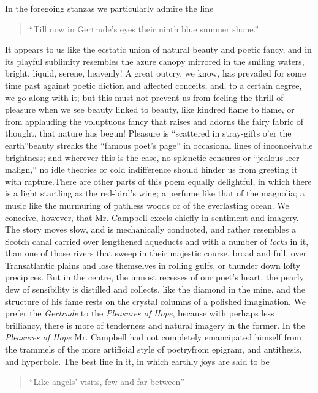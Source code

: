 In the foregoing stanzas we particularly admire the line\textemdash 
\begin{verse}
  ``Till now in Gertrude's eyes their ninth blue summer shone.''
\end{verse}
It appears to us like the ecstatic union of natural beauty and poetic
fancy, and in its playful sublimity resembles the azure canopy mirrored
in the smiling waters, bright, liquid, serene, heavenly! A great outcry,
we know, has prevailed for some time past against poetic diction and
affected conceits, and, to a certain degree, we go along with it; but
this must not prevent us from feeling the thrill of pleasure when we see
beauty linked to beauty, like kindred flame to flame, or from applauding
the voluptuous fancy that raises and adorns the fairy fabric of thought,
that nature has begun! Pleasure is ``scattered in stray-gifts o'er the
earth''\textemdash beauty streaks the ``famous poet's page'' in occasional lines of
inconceivable brightness; and wherever this is the case, no splenetic
censures or ``jealous leer malign,'' no idle theories or cold indifference
should hinder us from greeting it with rapture.\textemdash There are other parts
of this poem equally delightful, in which there is a light startling as
the red-bird's wing; a perfume like that of the magnolia; a music
like the murmuring of pathless woods or of the everlasting ocean. We
conceive, however, that Mr. Campbell excels chiefly in sentiment and
imagery. The story moves slow, and is mechanically conducted, and rather
resembles a Scotch canal carried over lengthened aqueducts and with a
number of \emph{locks} in it, than one of those rivers that sweep in their
majestic course, broad and full, over Transatlantic plains and lose
themselves in rolling gulfs, or thunder down lofty precipices. But in
the centre, the inmost recesses of our poet's heart, the pearly dew of
sensibility is distilled and collects, like the diamond in the mine, and
the structure of his fame rests on the crystal columns of a polished
imagination. We prefer the \emph{Gertrude} to the \emph{Pleasures of Hope},
because with perhaps less brilliancy, there is more of tenderness and
natural imagery in the former. In the \emph{Pleasures of Hope} Mr. Campbell
had not completely emancipated himself from the trammels of the more
artificial style of poetry\textemdash from epigram, and antithesis, and hyperbole.
The best line in it, in which earthly joys are said to be\textemdash 
\begin{verse}
  ``Like angels' visits, few and far between''\textemdash 
\end{verse}
